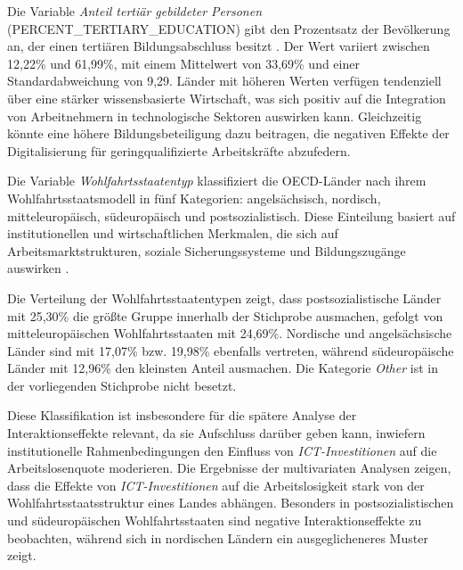 Die Variable \textit{Anteil tertiär gebildeter Personen} (PERCENT\_TERTIARY\_EDUCATION) gibt 
den Prozentsatz der Bevölkerung an, der einen tertiären Bildungsabschluss besitzt 
\parencite{oecd2022education}. Der Wert variiert zwischen 12,22\% und 61,99\%, mit einem 
Mittelwert von 33,69\% und einer Standardabweichung von 9,29. Länder mit höheren Werten 
verfügen tendenziell über eine stärker wissensbasierte Wirtschaft, was sich positiv auf die 
Integration von Arbeitnehmern in technologische Sektoren auswirken kann. Gleichzeitig könnte 
eine höhere Bildungsbeteiligung dazu beitragen, die negativen Effekte der Digitalisierung für 
geringqualifizierte Arbeitskräfte abzufedern.



Die Variable \textit{Wohlfahrtsstaatentyp} klassifiziert die OECD-Länder nach ihrem 
Wohlfahrtsstaatsmodell in fünf Kategorien: angelsächsisch, nordisch, mitteleuropäisch, 
südeuropäisch und postsozialistisch. Diese Einteilung basiert auf institutionellen und 
wirtschaftlichen Merkmalen, die sich auf Arbeitsmarktstrukturen, soziale Sicherungssysteme 
und Bildungszugänge auswirken \parencite[S. 56]{espingandersen1990thethree}.

Die Verteilung der Wohlfahrtsstaatentypen zeigt, dass postsozialistische Länder mit 
25,30\% die größte Gruppe innerhalb der Stichprobe ausmachen, gefolgt von 
mitteleuropäischen Wohlfahrtsstaaten mit 24,69\%. Nordische und angelsächsische 
Länder sind mit 17,07\% bzw. 19,98\% ebenfalls vertreten, während südeuropäische 
Länder mit 12,96\% den kleinsten Anteil ausmachen. Die Kategorie \textit{Other} ist 
in der vorliegenden Stichprobe nicht besetzt.

Diese Klassifikation ist insbesondere für die spätere Analyse der Interaktionseffekte 
relevant, da sie Aufschluss darüber geben kann, inwiefern institutionelle 
Rahmenbedingungen den Einfluss von \textit{\ac{ICT}-Investitionen} auf die Arbeitslosenquote 
moderieren. Die Ergebnisse der multivariaten Analysen zeigen, dass die Effekte von 
\textit{\ac{ICT}-Investitionen} auf die Arbeitslosigkeit stark von der Wohlfahrtsstaatsstruktur 
eines Landes abhängen.  Besonders in postsozialistischen und südeuropäischen Wohlfahrtsstaaten 
sind negative Interaktionseffekte zu beobachten, während sich in nordischen Ländern ein 
ausgeglicheneres Muster zeigt.

